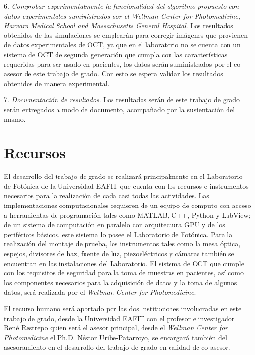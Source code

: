 6. \textit{Comprobar experimentalmente la funcionalidad del algoritmo propuesto con datos experimentales suministrados por el \emph{Wellman Center for Photomedicine, Harvard Medical School and Massachusetts General Hospital}}. Los resultados obtenidos de las simulaciones se emplearán para corregir imágenes que provienen de datos experimentales de OCT, ya que en el laboratorio no se cuenta con un sistema de OCT de segunda generación que cumpla con las características requeridas para ser usado en pacientes, los datos serán suministrados por el co-asesor de este trabajo de grado. Con esto se espera validar los resultados obtenidos de manera experimental.

7. \textit{Documentación de resultados}. Los resultados serán de este trabajo de grado serán entregados a modo de documento, acompañado por la sustentación del mismo.

\section{Recursos}
\label{sec:recursos}

El desarrollo del trabajo de grado se realizará principalmente en el Laboratorio de Fotónica de la Universidad EAFIT que cuenta con los recursos e instrumentos necesarios para la realización de cada casi todas las actividades. Las implementaciones computacionales requieren de un equipo de computo con acceso a herramientas de programación tales como MATLAB, C++, Python y LabView;  de un sistema de computación en paralelo con arquitectura GPU y de los periféricos básicos, este sistema lo posee el Laboratorio de Fotónica. Para la realización del montaje de prueba, los instrumentos tales como la mesa óptica, espejos, divisores de haz, fuente de luz, piezoeléctricos y cámaras también se encuentran en las instalaciones del Laboratorio. El sistema de OCT que cumple con los requisitos de seguridad para la toma de muestras en pacientes, así como los componentes necesarios para la adquisición de datos y la toma de algunos datos, será realizada por el \emph{Wellman Center for Photomedicine}.

El recurso humano será aportado por las dos instituciones involucradas en este trabajo de grado, desde la Universidad EAFIT con el profesor e investigador René Restrepo quien será el asesor principal, desde el \emph{Wellman Center for Photomedicine} el Ph.D. Néstor Uribe-Patarroyo, se encargará también del asesoramiento en el desarrollo del trabajo de grado en calidad de co-asesor.